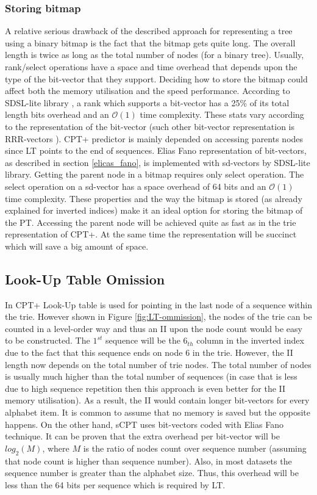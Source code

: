 \subsubsection*{Storing bitmap}
A relative serious drawback of the described approach for representing a tree using a binary bitmap is the fact that the bitmap gets quite long. The overall length is twice as long as the total number of nodes (for a binary tree). Usually, rank/select operations have a space and time overhead that depends upon the type of the bit-vector that they support. Deciding how to store the bitmap could affect both the memory utilisation and the speed performance. According to SDSL-lite library \cite{gog_2015}, a rank which supports a bit-vector has a 25\% of its total length bits overhead and an \(\mathcal{O}(1)\) time complexity. These stats vary according to the representation of the bit-vector (such other bit-vector representation is RRR-vectors \cite{Raman}). CPT+ predictor is mainly depended on accessing parents nodes since LT points to the end of sequences. Elias Fano representation of bit-vectors, as described in section \ref{elicas_fano}, is implemented with sd-vectors by SDSL-lite library. Getting the parent node in a bitmap requires only select operation. The select operation on a sd-vector has a space overhead of 64 bits and an \(\mathcal{O}(1)\) time complexity. These properties and the way the bitmap is stored (as already explained for inverted indices) make it an ideal option for storing the bitmap of the PT. Accessing the parent node will be achieved quite as fast as in the trie representation of CPT+. At the same time the representation will be succinct which will save a big amount of space. 
 
\subsection{Look-Up Table Omission}
In CPT+ Look-Up table is used for pointing in the last node of a sequence within the trie. However shown in Figure \ref{fig:LT-ommission}, the nodes of the trie can be counted in a level-order way and thus an II upon the node count would be easy to be constructed. The $1^{st}$ sequence will be the $6_{th}$ column in the inverted index due to the fact that this sequence ends on node 6 in the trie. However, the II length now depends on the total number of trie nodes. The total number of nodes is usually much higher than the total number of sequences (in case that is less due to high sequence repetition then this approach is even better for the II memory utilisation). As a result, the II would contain longer bit-vectors for every alphabet item. It is common to assume that no memory is saved but the opposite happens. On the other hand, sCPT uses bit-vectors coded with Elias Fano technique. It can be proven that the extra overhead per bit-vector will be $log_2(M)$, where $M$ is the ratio of nodes count over sequence number (assuming that node count is higher than sequence number). Also, in most datasets the sequence number is greater than the alphabet size. Thus, this overhead will be less than the 64 bits per sequence which is required by LT. 

